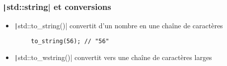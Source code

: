 \documentclass[C++.tex]{subfiles}
\begin{document}
\begin{frame}[fragile]
	\frametitle{\texttt|std::string| et conversions}
	\begin{itemize}
		\item \texttt|std::to_string()| convertit d'un nombre en une chaîne de caractères
	\end{itemize}

	\begin{verbatim}
		to_string(56); // "56"
	\end{verbatim}

	\begin{itemize}
		\item \texttt|std::to_wstring()| convertit vers une chaîne de caractères larges
	\end{itemize}

\end{frame}
\end{document}
